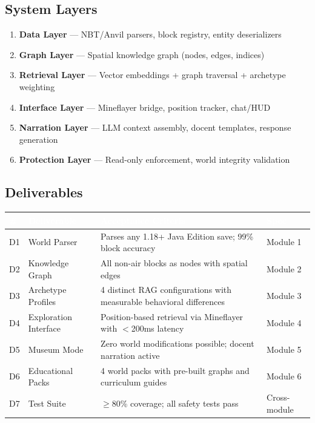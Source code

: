 \documentclass[11pt,letterpaper]{article}
\newcommand{\tableheader}[1]{\textbf{\sffamily\textcolor{white}{#1}}}
\begin{document}
\subsection{System Layers}
\begin{enumerate}[leftmargin=2em]
\item \textbf{Data Layer} --- NBT/Anvil parsers, block registry, entity deserializers
\item \textbf{Graph Layer} --- Spatial knowledge graph (nodes, edges, indices)
\item \textbf{Retrieval Layer} --- Vector embeddings + graph traversal + archetype weighting
\item \textbf{Interface Layer} --- Mineflayer bridge, position tracker, chat/HUD
\item \textbf{Narration Layer} --- LLM context assembly, docent templates, response generation
\item \textbf{Protection Layer} --- Read-only enforcement, world integrity validation
\end{enumerate}

\subsection{Deliverables}

\begin{center}
\begin{tabularx}{\textwidth}{C{0.8cm}L{3.5cm}XL{2.5cm}}
\toprule
{}
\tableheader{\#} & \tableheader{Deliverable} & \tableheader{Acceptance Criteria} & \tableheader{Spec} \\
\midrule
D1 & World Parser & Parses any 1.18+ Java Edition save; 99\% block accuracy & Module 1 \\
D2 & Knowledge Graph & All non-air blocks as nodes with spatial edges & Module 2 \\
D3 & Archetype Profiles & 4 distinct RAG configurations with measurable behavioral differences & Module 3 \\
D4 & Exploration Interface & Position-based retrieval via Mineflayer with $<$200ms latency & Module 4 \\
D5 & Museum Mode & Zero world modifications possible; docent narration active & Module 5 \\
D6 & Educational Packs & 4 world packs with pre-built graphs and curriculum guides & Module 6 \\
D7 & Test Suite & $\geq$80\% coverage; all safety tests pass & Cross-module \\
\bottomrule
\end{tabularx}
\end{center}
\end{document}
